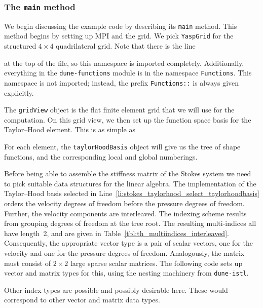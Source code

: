 \documentclass[a4paper,10pt,headings=normal,bibliography=totoc]{scrartcl}
\newcommand{\cpp}[1]{\lstinline[basicstyle=\ttfamily]!#1!}
\newcommand{\dunemodule}[1]{\texttt{#1}}
\begin{document}
\subsubsection{The \texorpdfstring{\cpp{main}}{main} method}

We begin discussing the example code by describing its \cpp{main} method.  This method begins by setting up MPI and the grid.
We pick \cpp{YaspGrid} for the structured $4 \times 4$ quadrilateral grid.  Note that there is the line
%

%
at the top of the file, so this namespace is imported completely.  Additionally, everything in the \dunemodule{dune-functions}
module is in the namespace \cpp{Functions}.  This namespace is not imported; instead, the prefix \cpp{Functions::} is always
given explicitly.


%

%
The \cpp{gridView} object is the flat finite element grid that we will use for
the computation.
On this grid view, we then set up the function space basis for the Taylor--Hood element.  This is as simple as
%

%
For each element, the \cpp{taylorHoodBasis} object will give us the tree of shape functions, and the corresponding local and global numberings.

Before being able to assemble the stiffness matrix of the Stokes system we need to pick suitable data structures
for the linear algebra.
The implementation of the Taylor--Hood basis selected in Line~\ref{li:stokes_taylorhood_select_taylorhoodbasis} orders the
velocity degrees of freedom before the pressure degrees of freedom.  Further, the velocity
components are interleaved.  The indexing scheme results from grouping degrees of freedom at the
tree root.  The resulting multi-indices all have length~2, and are given in Table~\ref{tbl:th_multiindices_interleaved}.
Consequently, the appropriate vector type is a pair of scalar vectors, one for the velocity and one for the pressure
degrees of freedom.  Analogously, the matrix must consist of $2 \times 2$ large sparse scalar matrices.
The following code sets up vector and matrix types for this, using the nesting machinery from \dunemodule{dune-istl}.
%

%
Other index types are possible and possibly desirable here.  These would correspond to other vector and
matrix data types.
\end{document}
